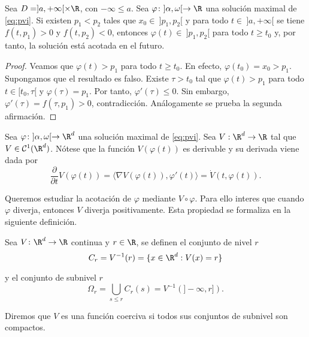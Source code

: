 \documentclass{article}
\begin{document}
\begin{proposition}
  Sea $D = ]a, +\infty[ \times \R$, con $-\infty \le a$. Sea
  $\varphi \colon ]\alpha, \omega[ \to \R$ una solución maximal de \eqref{eq:pvi}. Si existen
  $p_1 < p_2$ tales que $x_0 \in\ ]p_1, p_2[$ y para todo $t \in \ ]a, +\infty[$ se tiene
  $f(t, p_1) > 0$ y $f(t, p_2) < 0$, entonces $\varphi(t) \in \ ]p_1, p_2[$ para todo $t \ge t_0$ y,
  por tanto, la solución está acotada en el futuro.
\end{proposition}
\begin{proof}
  Veamos que $\varphi(t) > p_1$ para todo $t \ge t_0$. En efecto, $\varphi(t_0) = x_0 >
  p_1$. Supongamos que el resultado es falso. Existe $\tau > t_0$ tal que $\varphi(t) > p_1$ para
  todo $t \in [t_0, \tau[$ y $\varphi(\tau) = p_1$. Por tanto, $\varphi'(\tau) \le 0$. Sin embargo,
  $\varphi'(\tau) = f(\tau, p_1) > 0$, contradicción. Análogamente se prueba la segunda afirmación.
\end{proof}


Sea $\varphi \colon ]\alpha, \omega[ \to \R^d$ una solución maximal de \eqref{eq:pvi}.  Sea
$V : \R^d \to \R$ tal que $V \in \mathcal{C}^1(\R^d)$. Nótese que la función $V(\varphi(t))$ es
derivable y su derivada viene dada por
\[ \frac{\partial}{\partial t} V(\varphi(t)) = \langle \nabla V(\varphi(t)), \varphi'(t)\rangle =
  \dot{V}(t, \varphi(t)). \]

Queremos estudiar la acotación de $\varphi$ mediante $V \circ \varphi$. Para ello interes que cuando
$\varphi$ diverja, entonces $V$ diverja positivamente. Esta propiedad se formaliza en la siguiente
definición.

\begin{definition}
  Sea $V \colon \R^d \to \R$ continua y $r \in \R$, se definen el conjunto de nivel $r$
  \[C_r = V^{-1}(r) = \{x \in \R^d: V(x) = r\}\]

  y el conjunto de subnivel $r$
  \[\Omega_r = \bigcup_{s \le r} C_r(s) = V^{-1}(]-\infty,r]).\]

  Diremos que $V$ es una función coerciva si todos sus conjuntos de subnivel son compactos.
\end{definition}
\end{document}
